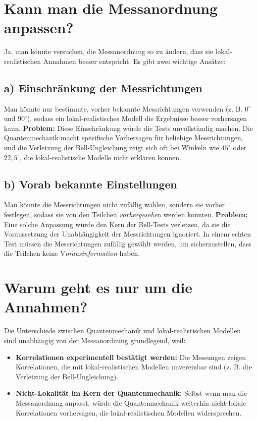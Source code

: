 \documentclass[12pt,a4paper]{article}
\begin{document}
	\section{Kann man die Messanordnung anpassen?}
	Ja, man könnte versuchen, die Messanordnung so zu ändern, dass sie lokal-realistischen Annahmen besser entspricht. Es gibt zwei wichtige Ansätze:
	
	\subsection{a) Einschränkung der Messrichtungen}
	Man könnte nur bestimmte, vorher bekannte Messrichtungen verwenden (z. B. $0^\circ$ und $90^\circ$), sodass ein lokal-realistisches Modell die Ergebnisse besser vorhersagen kann.
	\textbf{Problem:} Diese Einschränkung würde die Tests unvollständig machen. Die Quantenmechanik macht spezifische Vorhersagen für beliebige Messrichtungen, und die Verletzung der Bell-Ungleichung zeigt sich oft bei Winkeln wie $45^\circ$ oder $22,5^\circ$, die lokal-realistische Modelle nicht erklären können.
	
	\subsection{b) Vorab bekannte Einstellungen}
	Man könnte die Messrichtungen nicht zufällig wählen, sondern sie vorher festlegen, sodass sie von den Teilchen \textit{vorhergesehe}n werden könnten.
	\textbf{Problem:} Eine solche Anpassung würde den Kern der Bell-Tests verletzen, da sie die Voraussetzung der Unabhängigkeit der Messrichtungen ignoriert. In einem echten Test müssen die Messrichtungen zufällig gewählt werden, um sicherzustellen, dass die Teilchen keine V\textit{orausinformation} haben.
	
	\section{Warum geht es nur um die Annahmen?}
	Die Unterschiede zwischen Quantenmechanik und lokal-realistischen Modellen sind unabhängig von der Messanordnung grundlegend, weil:
	\begin{itemize}
		\item \textbf{Korrelationen experimentell bestätigt werden:} Die Messungen zeigen Korrelationen, die mit lokal-realistischen Modellen unvereinbar sind (z. B. die Verletzung der Bell-Ungleichung).
		\item \textbf{Nicht-Lokalität im Kern der Quantenmechanik:} Selbst wenn man die Messanordnung anpasst, würde die Quantenmechanik weiterhin nicht-lokale Korrelationen vorhersagen, die lokal-realistischen Modellen widersprechen.
	\end{itemize}
	
\end{document}
